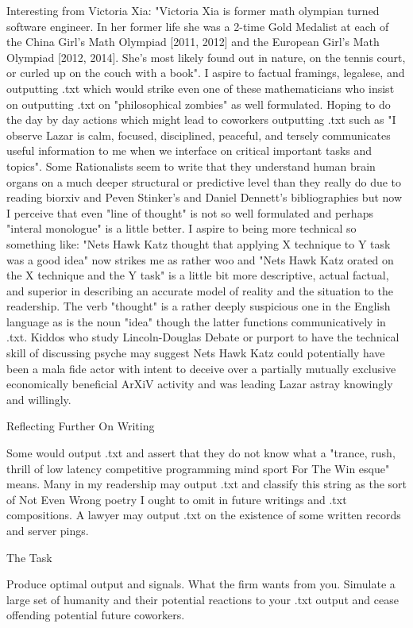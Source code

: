 Interesting from Victoria Xia: "Victoria Xia is former math olympian turned software engineer. In her former life she was a 2-time Gold Medalist at each of the China Girl's Math Olympiad [2011, 2012] and the European Girl's Math Olympiad [2012, 2014]. She's most likely found out in nature, on the tennis court, or curled up on the couch with a book". I aspire to factual framings, legalese, and outputting .txt which would strike even one of these mathematicians who insist on outputting .txt on "philosophical zombies" as well formulated. Hoping to do the day by day actions which might lead to coworkers outputting .txt such as "I observe Lazar is calm, focused, disciplined, peaceful, and tersely communicates useful information to me when we interface on critical important tasks and topics". Some Rationalists seem to write that they understand human brain organs on a much deeper structural or predictive level than they really do due to reading biorxiv and Peven Stinker's and Daniel Dennett's bibliographies but now I perceive that even "line of thought" is not so well formulated and perhaps "interal monologue" is a little better. I aspire to being more technical so something like: "Nets Hawk Katz thought that applying X technique to Y task was a good idea" now strikes me as rather woo and "Nets Hawk Katz orated on the X technique and the Y task" is a little bit more descriptive, actual factual, and superior in describing an accurate model of reality and the situation to the readership. The verb "thought" is a rather deeply suspicious one in the English language as is the noun "idea" though the latter functions communicatively in .txt. Kiddos who study Lincoln-Douglas Debate or purport to have the technical skill of discussing psyche may suggest Nets Hawk Katz could potentially have been a mala fide actor with intent to deceive over a partially mutually exclusive economically beneficial ArXiV activity and was leading Lazar astray knowingly and willingly.

	Reflecting Further On Writing

Some would output .txt and assert that they do not know what a "trance, rush, thrill of low latency competitive programming mind sport For The Win esque" means. Many in my readership may output .txt and classify this string as the sort of Not Even Wrong poetry I ought to omit in future writings and .txt compositions. A lawyer may output .txt on the existence of some written records and server pings.

	The Task

Produce optimal output and signals. What the firm wants from you. Simulate a large set of humanity and their potential reactions to your .txt output and cease offending potential future coworkers.

